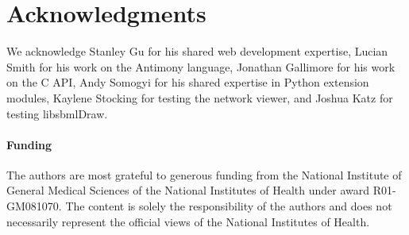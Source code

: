 \documentclass{bioinfo}
\begin{document}
\section*{Acknowledgments}
We acknowledge Stanley Gu for his shared web development expertise, Lucian Smith for his work on the Antimony language, Jonathan Gallimore for his work on the C API, Andy Somogyi for his shared expertise in Python extension modules, Kaylene Stocking for testing the network viewer, and Joshua Katz for testing libsbmlDraw.

\paragraph{Funding\textcolon} The authors are most grateful to generous funding from the National Institute of General Medical Sciences of the National Institutes of Health under award R01-GM081070. The content is solely the responsibility of the authors and does not necessarily represent the official views of the National Institutes of Health.

\makeatletter
\renewcommand\@biblabel[1]{}
\makeatother
\end{document}
